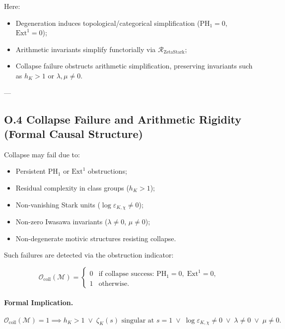 \documentclass[11pt]{article}
\begin{document}
Here:

\begin{itemize}
  \item Degeneration induces topological/categorical simplification (\( \mathrm{PH}_1 = 0 \), \( \mathrm{Ext}^1 = 0 \));
  \item Arithmetic invariants simplify functorially via \( \mathcal{R}_{\mathrm{ZetaStark}} \);
  \item Collapse failure obstructs arithmetic simplification, preserving invariants such as \( h_K > 1 \) or \( \lambda, \mu \neq 0 \).
\end{itemize}

---

\subsection*{O.4 Collapse Failure and Arithmetic Rigidity (Formal Causal Structure)}

Collapse may fail due to:

\begin{itemize}
  \item Persistent \( \mathrm{PH}_1 \) or \( \mathrm{Ext}^1 \) obstructions;
  \item Residual complexity in class groups (\( h_K > 1 \));
  \item Non-vanishing Stark units (\( \log \varepsilon_{K,\chi} \neq 0 \));
  \item Non-zero Iwasawa invariants (\( \lambda \neq 0 \), \( \mu \neq 0 \));
  \item Non-degenerate motivic structures resisting collapse.
\end{itemize}

Such failures are detected via the obstruction indicator:

\[
\mathcal{O}_{\mathrm{coll}}(\mathcal{M}) =
\begin{cases}
0 & \text{if collapse success: } \mathrm{PH}_1 = 0,\; \mathrm{Ext}^1 = 0, \\
1 & \text{otherwise}.
\end{cases}
\]

\paragraph{Formal Implication.}
\[
\mathcal{O}_{\mathrm{coll}}(\mathcal{M}) = 1 \implies
h_K > 1 \;\lor\; \zeta_K(s) \text{ singular at } s = 1 \;\lor\; \log \varepsilon_{K,\chi} \neq 0 \;\lor\; \lambda \neq 0 \;\lor\; \mu \neq 0.
\]
\end{document}
